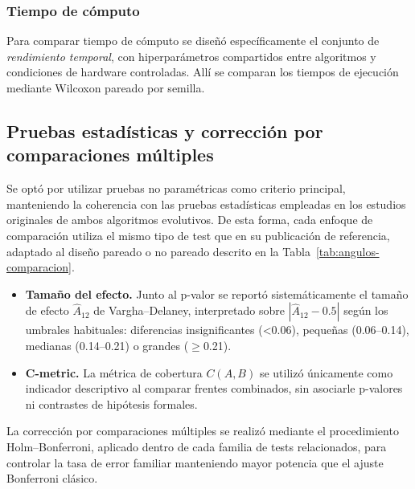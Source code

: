 \subsubsection{Tiempo de cómputo}

Para comparar tiempo de cómputo se diseñó específicamente el conjunto de \textit{rendimiento temporal}, con hiperparámetros compartidos entre algoritmos y condiciones de hardware controladas. Allí se comparan los tiempos de ejecución mediante Wilcoxon pareado por semilla.

\subsection{Pruebas estadísticas y corrección por comparaciones múltiples}\label{subsec:pruebas-estadisticas-correccion}

Se optó por utilizar pruebas no paramétricas como criterio principal, manteniendo la coherencia con las pruebas estadísticas empleadas en los estudios originales de ambos algoritmos evolutivos. De esta forma, cada enfoque de comparación utiliza el mismo tipo de test que en su publicación de referencia, adaptado al diseño pareado o no pareado descrito en la Tabla~\ref{tab:angulos-comparacion}.

\begin{itemize}
    \item \textbf{Tamaño del efecto.} Junto al p-valor se reportó sistemáticamente el tamaño de efecto \(\hat{A}_{12}\) de Vargha--Delaney, interpretado sobre \(|\hat{A}_{12} - 0.5|\) según los umbrales habituales: diferencias insignificantes (<0.06), pequeñas (0.06--0.14), medianas (0.14--0.21) o grandes (\(\geq\)0.21).
    \item \textbf{C-metric.} La métrica de cobertura \(C(A,B)\) se utilizó únicamente como indicador descriptivo al comparar frentes combinados, sin asociarle p-valores ni contrastes de hipótesis formales.
\end{itemize}

La corrección por comparaciones múltiples se realizó mediante el procedimiento Holm--Bonferroni, aplicado dentro de cada familia de tests relacionados, para controlar la tasa de error familiar manteniendo mayor potencia que el ajuste Bonferroni clásico.
